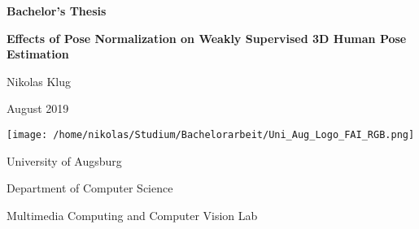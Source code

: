 \begin{titlepage}
	\centering
	
	\large{\textbf{Bachelor's Thesis}}
	\vspace{0.4cm}
	
	\huge{\textbf{Effects of Pose Normalization on Weakly Supervised 3D Human Pose Estimation}}\par
	
	\vspace{1cm}
	\Large{Nikolas Klug}
	
	\vspace{1cm}
	\Large{August 2019}
	
	\vspace{\fill}
	\texttt{[image: /home/nikolas/Studium/Bachelorarbeit/Uni\_Aug\_Logo\_FAI\_RGB.png]}
	\vspace{5mm}
	
	University of Augsburg
	
	Department of Computer Science
	
	Multimedia Computing and Computer Vision Lab
\end{titlepage}

\normalfont
\restoregeometry
\pagebreak


